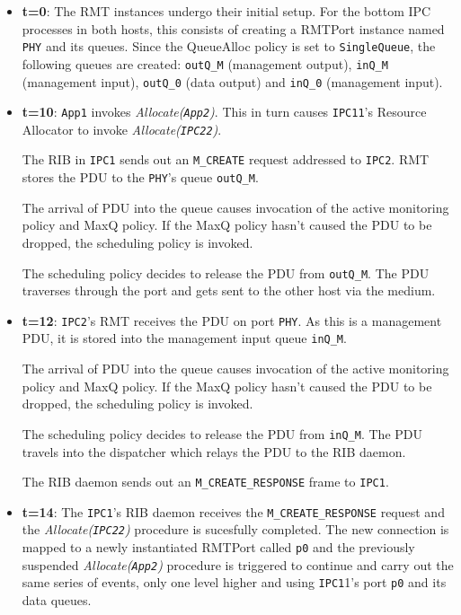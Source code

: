             \begin{itemize}
            \item \textbf{t=0}: The RMT instances undergo their initial setup. For the bottom IPC processes in both hosts, this consists of creating a RMTPort instance named \texttt{PHY} and its queues. Since the QueueAlloc policy is set to \texttt{SingleQueue}, the following queues are created: \texttt{outQ\_M} (management output), \texttt{inQ\_M} (management input), \texttt{outQ\_0} (data output) and \texttt{inQ\_0} (management input).

            \item \textbf{t=10}: \texttt{App1} invokes \emph{Allocate(\texttt{App2})}. This in turn causes \texttt{IPC11}'s Resource Allocator to invoke \emph{Allocate(\texttt{IPC22})}.

                The RIB in \texttt{IPC1} sends out an \texttt{M\_CREATE} request addressed to \texttt{IPC2}. RMT stores the PDU to the \texttt{PHY}'s queue \texttt{outQ\_M}.

                The arrival of PDU into the queue causes invocation of the active monitoring policy and MaxQ policy. If the MaxQ policy hasn't caused the PDU to be dropped, the scheduling policy is invoked.

                The scheduling policy decides to release the PDU from \texttt{outQ\_M}. The PDU traverses through the port and gets sent to the other host via the medium.

            \item \textbf{t=12}: \texttt{IPC2}'s RMT receives the PDU on port \texttt{PHY}. As this is a management PDU, it is stored into the management input queue \texttt{inQ\_M}.

                The arrival of PDU into the queue causes invocation of the active monitoring policy and MaxQ policy. If the MaxQ policy hasn't caused the PDU to be dropped, the scheduling policy is invoked.

                The scheduling policy decides to release the PDU from \texttt{inQ\_M}. The PDU travels into the dispatcher which relays the PDU to the RIB daemon.

                The RIB daemon sends out an \texttt{M\_CREATE\_RESPONSE} frame to \texttt{IPC1}.

            \item \textbf{t=14}: The \texttt{IPC1}'s RIB daemon receives the \texttt{M\_CREATE\_RESPONSE} request and the \emph{Allocate(\texttt{IPC22})} procedure is sucesfully completed. The new connection is mapped to a newly instantiated RMTPort called \texttt{p0} and the previously suspended \emph{Allocate(\texttt{App2})} procedure is triggered to continue and carry out the same series of events, only one level higher and using \texttt{IPC1}1's port \texttt{p0} and its data queues.


\end{itemize}

